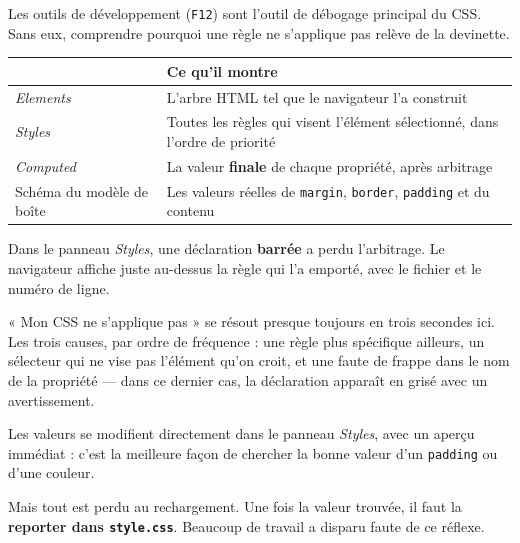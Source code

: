 \documentclass[a4paper,11pt]{article}
\newcommand{\hdr}[1]{\multicolumn{1}{l}{\color{white}\bfseries #1}}
\renewcommand{\arraystretch}{1.3}
\begin{document}
Les outils de développement (\texttt{F12}) sont l'outil de débogage principal du CSS. Sans eux, comprendre pourquoi une règle ne s'applique pas relève de la devinette.

\begin{center}
\renewcommand{\arraystretch}{1.0}
\begin{tabularx}{\linewidth}{p{4cm}X}
  \toprule
  \rowcolor{uniNavy}
  \hdr{Panneau} & \hdr{Ce qu'il montre} \\
  \midrule
  \rowcolor{uniPaper}
  \textit{Elements} & L'arbre HTML tel que le navigateur l'a construit \\
  \textit{Styles} & Toutes les règles qui visent l'élément sélectionné, dans l'ordre de priorité \\
  \rowcolor{uniPaper}
  \textit{Computed} & La valeur \textbf{finale} de chaque propriété, après arbitrage \\
  Schéma du modèle de boîte & Les valeurs réelles de \texttt{margin}, \texttt{border}, \texttt{padding} et du contenu \\
  \bottomrule
\end{tabularx}
\end{center}

\begin{tcolorbox}[astuce, title={La déclaration barrée est la réponse à ta question}]
Dans le panneau \textit{Styles}, une déclaration \textbf{barrée} a perdu l'arbitrage. Le navigateur affiche juste au-dessus la règle qui l'a emporté, avec le fichier et le numéro de ligne.

\vspace{3pt}
« Mon CSS ne s'applique pas » se résout presque toujours en trois secondes ici. Les trois causes, par ordre de fréquence : une règle plus spécifique ailleurs, un sélecteur qui ne vise pas l'élément qu'on croit, et une faute de frappe dans le nom de la propriété --- dans ce dernier cas, la déclaration apparaît en grisé avec un avertissement.
\end{tcolorbox}

\begin{tcolorbox}[attention, title={Modifier dans les DevTools ne sauvegarde rien}]
Les valeurs se modifient directement dans le panneau \textit{Styles}, avec un aperçu immédiat : c'est la meilleure façon de chercher la bonne valeur d'un \texttt{padding} ou d'une couleur.

\vspace{3pt}
Mais tout est perdu au rechargement. Une fois la valeur trouvée, il faut la \textbf{reporter dans \texttt{style.css}}. Beaucoup de travail a disparu faute de ce réflexe.
\end{tcolorbox}
\end{document}
